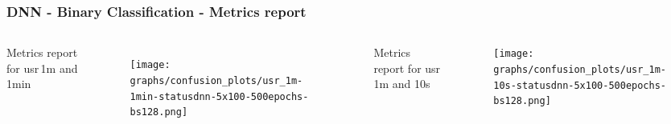 \documentclass[aspectratio=169,11pt,hyperref={colorlinks=true}]{beamer}
\begin{document}
\begin{frame}
    \frametitle{DNN - Binary Classification - Metrics report}
    \begin{columns}
      \begin{table}[h!]
        \begin{center}
          \caption{Metrics report for usr\,1m and 1min}
        \end{center}
      \end{table}

      \begin{figure}
        \texttt{[image: graphs/confusion\_plots/usr\_1m-1min-statusdnn-5x100-500epochs-bs128.png]}
      \end{figure}
      \begin{table}[h!]
        \begin{center}
          \caption{Metrics report for usr\,1m and 10s}
      \end{center}
      \end{table}
        \begin{center}
          \begin{figure}
            \texttt{[image: graphs/confusion\_plots/usr\_1m-10s-statusdnn-5x100-500epochs-bs128.png]}
          \end{figure}
        \end{center}
  \end{columns}
\end{frame}
\end{document}
